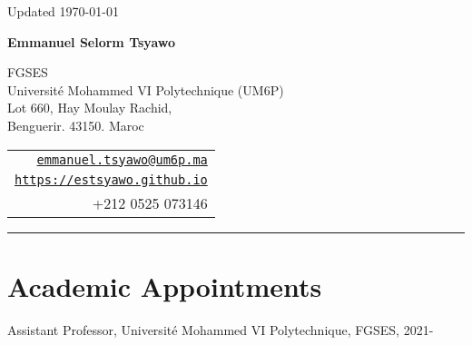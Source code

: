 \documentclass[12pt,letterpaper]{article}
\def\name{Emmanuel Selorm Tsyawo}
\renewenvironment{itemize}{
  \begin{list}{}{
    \setlength{\leftmargin}{1.5em}
  }
}{
  \end{list}
}
\begin{document}
\begin{minipage}{\linewidth}
  \begin{flushright}
    Updated \today
  \end{flushright}
\end{minipage}

\vspace{10pt}


\centerline{\huge \bf \name}

\vspace{0.25in}

\begin{minipage}{0.65\linewidth}
	FGSES\\
	Université Mohammed VI Polytechnique (UM6P)\\
	Lot 660, Hay Moulay Rachid, \\
	Benguerir. 43150.  Maroc
\end{minipage}
\begin{minipage}{0.5\linewidth}
  \begin{tabular}{r}
    \href{mailto:emmanuel.tsyawo@um6p.ma}{\tt emmanuel.tsyawo@um6p.ma} \\
    \href{https://estsyawo.github.io}{\tt https://estsyawo.github.io} \\
    +212 0525 073146%
    
  \end{tabular}
\end{minipage}

\vspace{10pt}
\rule{\linewidth}{0.4pt}


\section*{Academic Appointments}
\begin{itemize}
  \item Assistant Professor, Universit\'e Mohammed VI Polytechnique, FGSES, 2021-
\end{itemize}
\end{document}

